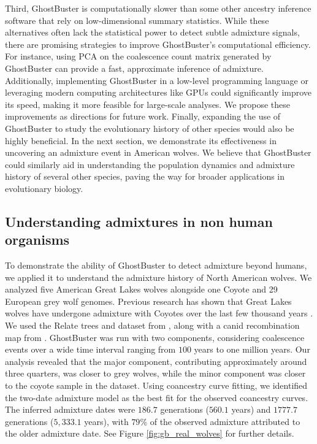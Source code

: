 Third, GhostBuster is computationally slower than some other ancestry inference software that rely on low-dimensional summary statistics. While these alternatives often lack the statistical power to detect subtle admixture signals, there are promising strategies to improve GhostBuster’s computational efficiency. For instance, using PCA on the coalescence count matrix generated by GhostBuster can provide a fast, approximate inference of admixture. Additionally, implementing GhostBuster in a low-level programming language or leveraging modern computing architectures like GPUs could significantly improve its speed, making it more feasible for large-scale analyses. We propose these improvements as directions for future work. Finally, expanding the use of GhostBuster to study the evolutionary history of other species would also be highly beneficial. In the next section, we demonstrate its effectiveness in uncovering an admixture event in American wolves. We believe that GhostBuster could similarly aid in understanding the population dynamics and admixture history of several other species, paving the way for broader applications in evolutionary biology. 


\subsection{Understanding admixtures in non human organisms}

To demonstrate the ability of GhostBuster to detect admixture beyond humans, we applied it to understand the admixture history of North American wolves. We analyzed five American Great Lakes wolves alongside one Coyote and 29 European grey wolf genomes. Previous research has shown that Great Lakes wolves have undergone admixture with Coyotes over the last few thousand years \cite{lehman1991introgression,bozarth2011coyote,vonholdt2016whole}. We used the Relate trees and dataset from \cite{bergstrom2022grey}, along with a canid recombination map from \cite{auton2013genetic}. GhostBuster was run with two components, considering coalescence events over a wide time interval ranging from $100$ years to one million years. Our analysis revealed that the major component, contributing approximately around three quarters, was closer to grey wolves, while the minor component was closer to the coyote sample in the dataset. Using coancestry curve fitting, we identified the two-date admixture model as the best fit for the observed coancestry curves. The inferred admixture dates were $186.7$ generations ($560.1$ years) and $1777.7$ generations ($5{,}333.1$ years), with $79$\% of the observed admixture attributed to the older admixture date. See Figure \ref{fig:gb_real_wolves} for further details.

